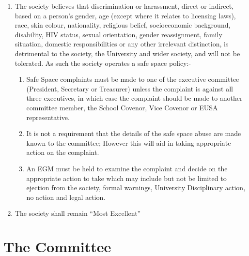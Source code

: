 \documentclass[a4paper]{article}
\begin{document}
\begin{enumerate}
  \item The society believes that discrimination or harassment, direct or indirect,
    based on a person’s gender, age (except where it relates to licensing
    laws), race, skin colour, nationality, religious belief, socioeconomic background,
    disability, HIV status, sexual orientation, gender reassignment,
    family situation, domestic responsibilities or any other irrelevant distinction,
    is detrimental to the society, the University and wider society, and
    will not be tolerated. As such the society operates a safe space policy:-
    \begin{enumerate}
      \item Safe Space complaints must be made to one of the executive committee (President, 
        Secretary or Treasurer) unless the complaint is against all three executives, in which case the 
        complaint should be made to another committee member, the School Covenor, Vice Covenor or EUSA representative.
      \item It is not a requirement that the details of the safe space abuse are made known to the committee; However
        this will aid in taking appropriate action on the complaint.
      \item An EGM must be held to examine the complaint and decide on the appropriate action to
        take which may include but not be limited to ejection from the society, formal warnings, University Disciplinary 
        action, no action and legal action.
    \end{enumerate}
    
  \item The society shall remain ``Most Excellent''

\end{enumerate}



\newpage{}
\section{The Committee}
\end{document}
